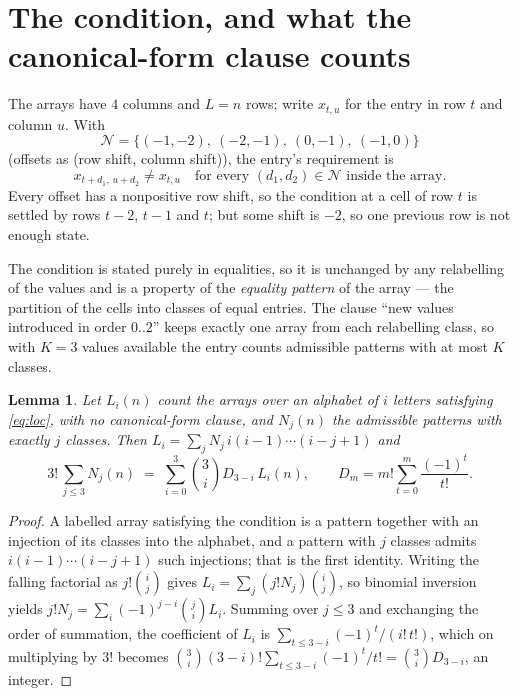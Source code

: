 \documentclass[11pt,a4paper]{article}
\theoremstyle{plain}
\newtheorem{lemma}[theorem]{Lemma}
\theoremstyle{definition}
\begin{document}
\section{The condition, and what the canonical-form clause counts}

The arrays have $4$ columns and $L=n$ rows; write $x_{t,u}$ for the entry in
row $t$ and column $u$. With
\[
\mathcal N=\{(-1,-2),\ (-2,-1),\ (0,-1),\ (-1,0)\}
\]
(offsets as (row shift, column shift)), the entry's requirement is
\begin{equation}\label{eq:loc}
x_{t+d_1,\,u+d_2}\ne x_{t,u}\quad\text{for every }(d_1,d_2)\in\mathcal N\text{ inside the array}.
\end{equation}
Every offset has a nonpositive row shift, so the condition at a cell of row $t$ is
settled by rows $t-2$, $t-1$ and $t$; but some shift is $-2$, so one previous row is not
enough state.

The condition is stated purely in equalities, so it is unchanged by any relabelling of the
values and is a property of the \emph{equality pattern} of the array --- the partition of
the cells into classes of equal entries. The clause ``new values introduced in order
$0..2$'' keeps exactly one array from each relabelling class, so with $K=3$ values
available the entry counts admissible patterns with at most $K$ classes.

\begin{lemma}\label{lem:inv}
Let $L_i(n)$ count the arrays over an alphabet of $i$ letters satisfying \eqref{eq:loc},
with no canonical-form clause, and $N_j(n)$ the admissible patterns with exactly $j$ classes.
Then $L_i=\sum_j N_j\,i(i-1)\cdots(i-j+1)$ and
\[
3!\,\sum_{j\le 3}N_j(n)\;=\;\sum_{i=0}^{3}\binom{3}{i}D_{3-i}\,L_i(n),
\qquad D_m=m!\sum_{t=0}^{m}\frac{(-1)^t}{t!} .
\]
\end{lemma}

\begin{proof}
A labelled array satisfying the condition is a pattern together with an injection of its
classes into the alphabet, and a pattern with $j$ classes admits $i(i-1)\cdots(i-j+1)$ such
injections; that is the first identity. Writing the falling factorial as $j!\binom{i}{j}$
gives $L_i=\sum_j(j!N_j)\binom{i}{j}$, so binomial inversion yields
$j!N_j=\sum_i(-1)^{j-i}\binom{j}{i}L_i$. Summing over $j\le3$ and exchanging the
order of summation, the coefficient of $L_i$ is $\sum_{t\le3-i}(-1)^t/(i!\,t!)$, which on
multiplying by $3!$ becomes
$\binom{3}{i}(3-i)!\sum_{t\le3-i}(-1)^t/t!=\binom{3}{i}D_{3-i}$, an
integer.
\end{proof}
\end{document}
